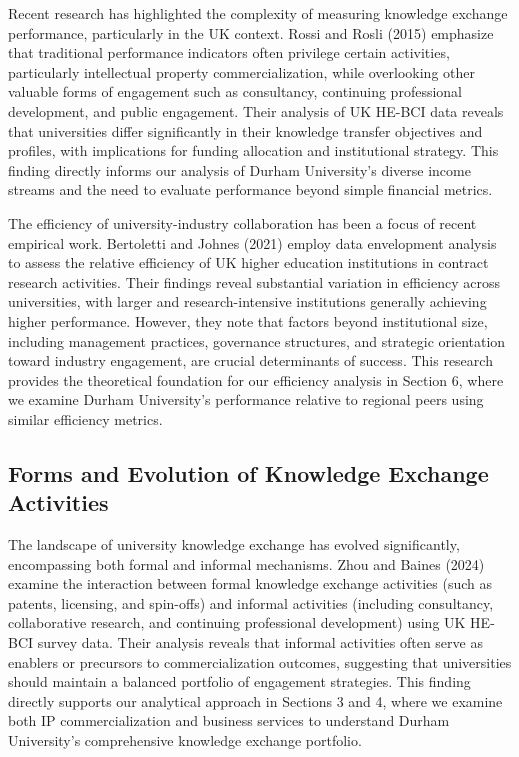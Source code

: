 \documentclass[journal,onecolumn, 10pt,draftclsnofoot]{IEEEtran}
\begin{document}
Recent research has highlighted the complexity of measuring knowledge exchange performance, particularly in the UK context. Rossi and Rosli (2015) \cite{rossi2015indicators} emphasize that traditional performance indicators often privilege certain activities, particularly intellectual property commercialization, while overlooking other valuable forms of engagement such as consultancy, continuing professional development, and public engagement. Their analysis of UK HE-BCI data reveals that universities differ significantly in their knowledge transfer objectives and profiles, with implications for funding allocation and institutional strategy. This finding directly informs our analysis of Durham University's diverse income streams and the need to evaluate performance beyond simple financial metrics.

The efficiency of university-industry collaboration has been a focus of recent empirical work. Bertoletti and Johnes (2021) \cite{bertoletti2021efficiency} employ data envelopment analysis to assess the relative efficiency of UK higher education institutions in contract research activities. Their findings reveal substantial variation in efficiency across universities, with larger and research-intensive institutions generally achieving higher performance. However, they note that factors beyond institutional size, including management practices, governance structures, and strategic orientation toward industry engagement, are crucial determinants of success. This research provides the theoretical foundation for our efficiency analysis in Section 6, where we examine Durham University's performance relative to regional peers using similar efficiency metrics.

\subsection{Forms and Evolution of Knowledge Exchange Activities}

The landscape of university knowledge exchange has evolved significantly, encompassing both formal and informal mechanisms. Zhou and Baines (2024) \cite{zhou2024extent} examine the interaction between formal knowledge exchange activities (such as patents, licensing, and spin-offs) and informal activities (including consultancy, collaborative research, and continuing professional development) using UK HE-BCI survey data. Their analysis reveals that informal activities often serve as enablers or precursors to commercialization outcomes, suggesting that universities should maintain a balanced portfolio of engagement strategies. This finding directly supports our analytical approach in Sections 3 and 4, where we examine both IP commercialization and business services to understand Durham University's comprehensive knowledge exchange portfolio.
\end{document}
